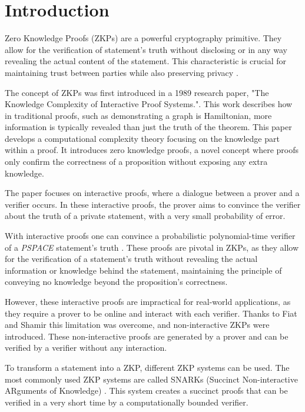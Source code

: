 \chapter{Introduction}

Zero Knowledge Proofs (ZKPs) are a powerful cryptography primitive. They allow
for the verification of statement's truth without disclosing or in any way revealing
the actual content of the statement. This characteristic is crucial for
maintaining trust between parties while also preserving privacy \cite{goldreich1991proofs}.

The concept of ZKPs was first introduced in a 1989 research paper, "The
Knowledge Complexity of Interactive Proof Systems."\cite{Goldwasser1989}.
This work describes how in traditional proofs, such as demonstrating a graph
is Hamiltonian, more information is typically revealed than just the truth of
the theorem. This paper develops a computational complexity theory focusing
on the knowledge part within a proof. It introduces zero knowledge proofs,
a novel concept where proofs only confirm the correctness of a proposition
without exposing any extra knowledge.

The paper focuses on interactive proofs, where a dialogue between a prover and
a verifier occurs. In these interactive proofs, the prover aims to convince
the verifier about the truth of a private statement, with a very small
probability of error.

With interactive proofs one can convince a probabilistic polynomial-time verifier
of a \emph{PSPACE} statement's truth \cite{Shamir1992, Lund1992}. These proofs
are pivotal in ZKPs, as they allow for the verification of a statement's truth
without revealing the actual information or knowledge behind the statement,
maintaining the principle of conveying no knowledge beyond the proposition's
correctness.

However, these interactive proofs are impractical for real-world applications, as they
require a prover to be online and interact with each verifier. Thanks to Fiat
and Shamir \cite{Fiat} this limitation was overcome, and non-interactive
ZKPs were introduced. These non-interactive proofs are
generated by a prover and can be verified by a verifier without any
interaction.

To transform a statement into a ZKP, different ZKP systems can be used. The most
commonly used ZKP systems are called SNARKs (Succinct Non-interactive ARguments
of Knowledge) \cite{Groth16}. This system creates a succinct proofs that can be
verified in a very short time by a computationally bounded verifier.

